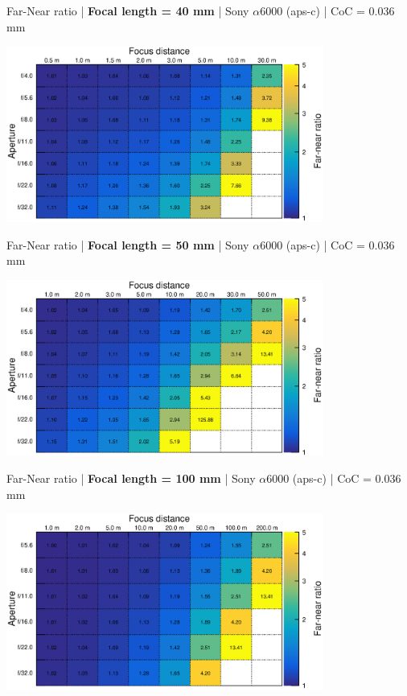 \documentclass[aspectratio=169]{beamer}
\begin{document}
\begin{frame}[plain]{}
  \vspace{1ex}
  \centering
  Far-Near ratio | {\bf Focal length = 40 mm} |  Sony $\alpha$\hspace{0.1em}6000 (aps-c) | CoC = 0.036 mm
  
  \includegraphics[center,width=0.78\textwidth]{img/far-near-ratio_focl40.eps}
\end{frame}

\begin{frame}[plain]{}
  \vspace{1ex}
  \centering
  Far-Near ratio | {\bf Focal length = 50 mm} |  Sony $\alpha$\hspace{0.1em}6000 (aps-c) | CoC = 0.036 mm
  
  \includegraphics[center,width=0.78\textwidth]{img/far-near-ratio_focl50.eps}
\end{frame}

\begin{frame}[plain]{}
  \vspace{1ex}
  \centering
  Far-Near ratio | {\bf Focal length = 100 mm} |  Sony $\alpha$\hspace{0.1em}6000 (aps-c) | CoC = 0.036 mm
  
  \includegraphics[center,width=0.78\textwidth]{img/far-near-ratio_focl100.eps}
\end{frame}
\end{document}
